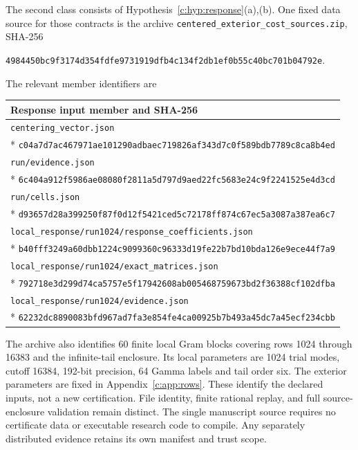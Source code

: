 \documentclass[11pt,a4paper]{article}
\numberwithin{equation}{section}
\theoremstyle{definition}\newtheorem{definition}[theorem]{Definition}
\theoremstyle{remark}\newtheorem{remark}[theorem]{Remark}
\begin{document}
The second class consists of Hypothesis~\ref{c:hyp:response}(a),(b).
One fixed data source for those contracts is the archive
\texttt{centered\_exterior\_cost\_sources.zip}, SHA-256
\begin{center}\small
\nolinkurl{4984450bc9f3174d354fdfe9731919dfb4c134f2db1ef0b55c40bc701b04792e}.
\end{center}
The relevant member identifiers are
\begingroup\small
\begin{longtable}{@{}p{}@{}}
\toprule Response input member and SHA-256\\\midrule\endhead
\texttt{centering\_vector.json}\\*
\nolinkurl{c04a7d7ac467971ae101290adbaec719826af343d7c0f589bdb7789c8ca8b4ed}\\[3pt]
\texttt{run/evidence.json}\\*
\nolinkurl{6c404a912f5986ae08080f2811a5d797d9aed22fc5683e24c9f2241525e4d3cd}\\[3pt]
\texttt{run/cells.json}\\*
\nolinkurl{d93657d28a399250f87f0d12f5421ced5c72178ff874c67ec5a3087a387ea6c7}\\[3pt]
\texttt{local\_response/run1024/response\_coefficients.json}\\*
\nolinkurl{b40fff3249a60dbb1224c9099360c96333d19fe22b7bd10bda126e9ece44f7a9}\\[3pt]
\texttt{local\_response/run1024/exact\_matrices.json}\\*
\nolinkurl{792718e3d299d74ca5757e5f17942608ab005468759673bd2f36388cf102dfba}\\[3pt]
\texttt{local\_response/run1024/evidence.json}\\*
\nolinkurl{62232dc8890083bfd967ad7fa3e854fe4ca00925b7b493a45dc7a45ecf234cbb}\\
\bottomrule
\end{longtable}\endgroup
The archive also identifies 60 finite local Gram blocks covering rows 1024 through 16383 and the infinite-tail enclosure.
Its local parameters are 1024 trial modes, cutoff 16384, 192-bit precision, 64 Gamma labels and tail order six.
The exterior parameters are fixed in Appendix~\ref{c:app:rows}.
These identify the declared inputs, not a new certification.
File identity, finite rational replay, and full source-enclosure validation remain distinct.
The single manuscript source requires no certificate data or executable research code to compile. Any separately distributed evidence retains its own manifest and trust scope.
\end{document}
